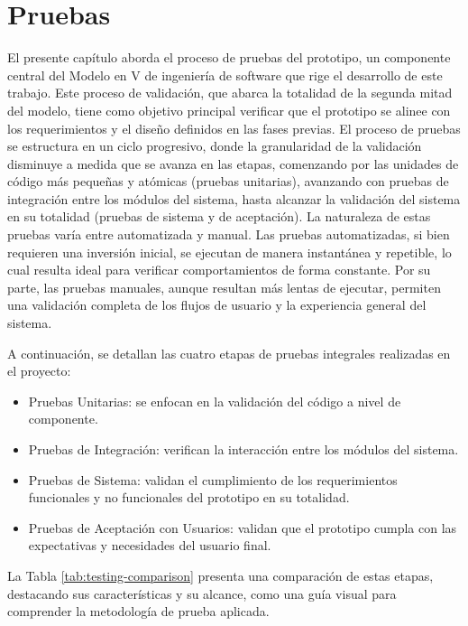 \chapter[Pruebas]{Pruebas}
\label{cp:testing}

\parindent0pt

El presente capítulo aborda el proceso de pruebas del prototipo, un componente central del Modelo en V de ingeniería de software que rige el desarrollo de este trabajo. Este proceso de validación, que abarca la totalidad de la segunda mitad del modelo, tiene como objetivo principal verificar que el prototipo se alinee con los requerimientos y el diseño definidos en las fases previas. El proceso de pruebas se estructura en un ciclo progresivo, donde la granularidad de la validación disminuye a medida que se avanza en las etapas, comenzando por las unidades de código más pequeñas y atómicas (pruebas unitarias), avanzando con pruebas de integración entre los módulos del sistema, hasta alcanzar la validación del sistema en su totalidad (pruebas de sistema y de aceptación). La naturaleza de estas pruebas varía entre automatizada y manual. Las pruebas automatizadas, si bien requieren una inversión inicial, se ejecutan de manera instantánea y repetible, lo cual resulta ideal para verificar comportamientos de forma constante. Por su parte, las pruebas manuales, aunque resultan más lentas de ejecutar, permiten una validación completa de los flujos de usuario y la experiencia general del sistema.

A continuación, se detallan las cuatro etapas de pruebas integrales realizadas en el proyecto:

\begin{itemize}
\item Pruebas Unitarias: se enfocan en la validación del código a nivel de componente.
\item Pruebas de Integración: verifican la interacción entre los módulos del sistema.
\item Pruebas de Sistema: validan el cumplimiento de los requerimientos funcionales y no funcionales del prototipo en su totalidad.
\item Pruebas de Aceptación con Usuarios: validan que el prototipo cumpla con las expectativas y necesidades del usuario final.
\end{itemize}
La Tabla \ref{tab:testing-comparison} presenta una comparación de estas etapas, destacando sus características y su alcance, como una guía visual para comprender la metodología de prueba aplicada.

